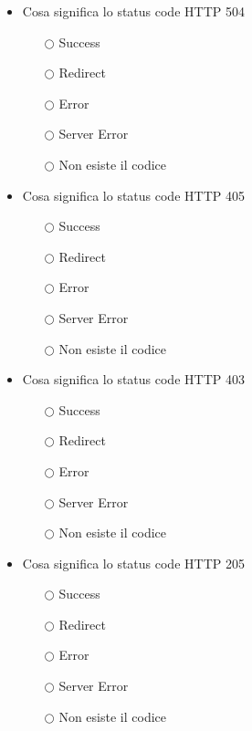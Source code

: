 \documentclass[10pt,twocolumn]{article}
\begin{document}
\begin{itemize}
    \item Cosa significa lo status code HTTP 504
          \begin{itemize}
              \item[$\bigcirc$] Success
              \item[$\bigcirc$] Redirect
              \item[$\bigcirc$] Error
              \item[$\bigcirc$] Server Error
              \item[$\bigcirc$] Non esiste il codice
          \end{itemize}
\end{itemize}
\begin{itemize}
    \item Cosa significa lo status code HTTP 405
          \begin{itemize}
              \item[$\bigcirc$] Success
              \item[$\bigcirc$] Redirect
              \item[$\bigcirc$] Error
              \item[$\bigcirc$] Server Error
              \item[$\bigcirc$] Non esiste il codice
          \end{itemize}
\end{itemize}
\begin{itemize}
    \item Cosa significa lo status code HTTP 403
          \begin{itemize}
              \item[$\bigcirc$] Success
              \item[$\bigcirc$] Redirect
              \item[$\bigcirc$] Error
              \item[$\bigcirc$] Server Error
              \item[$\bigcirc$] Non esiste il codice
          \end{itemize}
\end{itemize}
\begin{itemize}
    \item Cosa significa lo status code HTTP 205
          \begin{itemize}
              \item[$\bigcirc$] Success
              \item[$\bigcirc$] Redirect
              \item[$\bigcirc$] Error
              \item[$\bigcirc$] Server Error
              \item[$\bigcirc$] Non esiste il codice
          \end{itemize}
\end{itemize}
\end{document}

